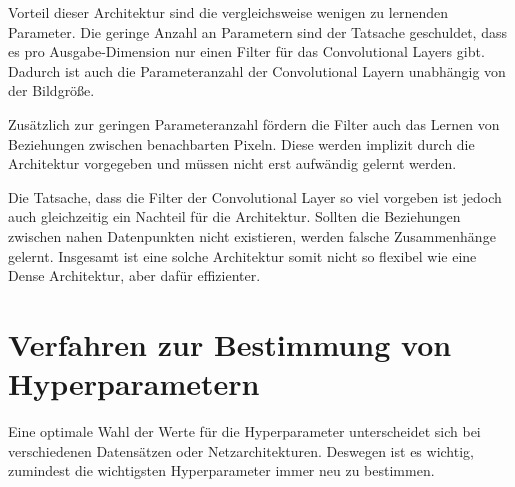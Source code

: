 Vorteil dieser Architektur sind die vergleichsweise wenigen zu lernenden Parameter.
Die geringe Anzahl an Parametern sind der Tatsache geschuldet, dass es pro Ausgabe-Dimension nur einen Filter für das Convolutional Layers gibt.
Dadurch ist auch die Parameteranzahl der Convolutional Layern unabhängig von der Bildgröße.

Zusätzlich zur geringen Parameteranzahl fördern die Filter auch das Lernen von Beziehungen  zwischen benachbarten Pixeln.
Diese werden implizit durch die Architektur vorgegeben und müssen nicht erst aufwändig gelernt werden.
\newline

Die Tatsache, dass die Filter der Convolutional Layer so viel vorgeben ist jedoch auch gleichzeitig ein Nachteil für die Architektur.
Sollten die Beziehungen zwischen nahen Datenpunkten nicht existieren, werden falsche Zusammenhänge gelernt.
Insgesamt ist eine solche Architektur somit nicht so flexibel wie eine Dense Architektur, aber dafür effizienter.

\section{Verfahren zur Bestimmung von Hyperparametern}
\label{chapter:verfahren-bestimmung-hyperparameter}

Eine optimale Wahl der Werte für die Hyperparameter unterscheidet sich bei verschiedenen Datensätzen oder Netzarchitekturen. 
Deswegen ist es wichtig, zumindest die wichtigsten Hyperparameter immer neu zu bestimmen.

